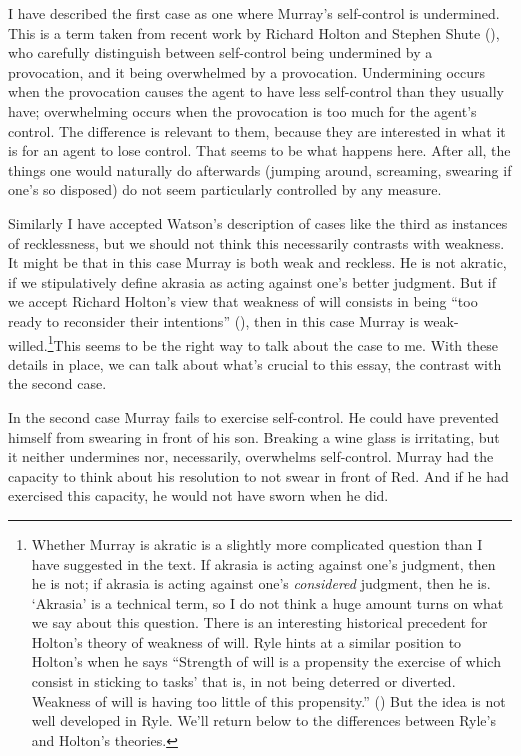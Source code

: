 \documentclass[
  10pt,
  letterpaper,
  DIV=11,
  numbers=noendperiod,
  twoside]{scrartcl}
\begin{document}
I have described the first case as one where Murray's self-control is
undermined. This is a term taken from recent work by Richard Holton and
Stephen Shute (), who carefully
distinguish between self-control being undermined by a provocation, and
it being overwhelmed by a provocation. Undermining occurs when the
provocation causes the agent to have less self-control than they usually
have; overwhelming occurs when the provocation is too much for the
agent's control. The difference is relevant to them, because they are
interested in what it is for an agent to lose control. That seems to be
what happens here. After all, the things one would naturally do
afterwards (jumping around, screaming, swearing if one's so disposed) do
not seem particularly controlled by any measure.

Similarly I have accepted Watson's description of cases like the third
as instances of recklessness, but we should not think this necessarily
contrasts with weakness. It might be that in this case Murray is both
weak and reckless. He is not akratic, if we stipulatively define akrasia
as acting against one's better judgment. But if we accept Richard
Holton's view that weakness of will consists in being ``too ready to
reconsider their intentions'' (), then in this case Murray is weak-willed.\footnote{Whether Murray
  is akratic is a slightly more complicated question than I have
  suggested in the text. If akrasia is acting against one's judgment,
  then he is not; if akrasia is acting against one's \emph{considered}
  judgment, then he is. `Akrasia' is a technical term, so I do not think
  a huge amount turns on what we say about this question. There is an
  interesting historical precedent for Holton's theory of weakness of
  will. Ryle hints at a similar position to Holton's when he says
  ``Strength of will is a propensity the exercise of which consist in
  sticking to tasks' that is, in not being deterred or diverted.
  Weakness of will is having too little of this propensity.''
  () But the idea is not well developed
  in Ryle. We'll return below to the differences between Ryle's and
  Holton's theories.}This seems to be the right way to talk about the
case to me. With these details in place, we can talk about what's
crucial to this essay, the contrast with the second case.

In the second case Murray fails to exercise self-control. He could have
prevented himself from swearing in front of his son. Breaking a wine
glass is irritating, but it neither undermines nor, necessarily,
overwhelms self-control. Murray had the capacity to think about his
resolution to not swear in front of Red. And if he had exercised this
capacity, he would not have sworn when he did.
\end{document}
